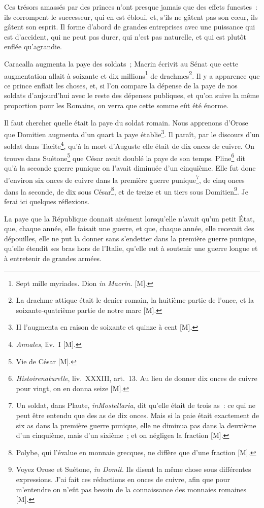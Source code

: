 \documentclass[french,twoside]{book} %
\begin{document}
Ces trésors amassés par des princes n’ont presque jamais que des effets funestes : ils corrompent le successeur, qui en est ébloui, et, s’ils ne gâtent pas son cœur, ils gâtent son esprit. Il forme d’abord de grandes entreprises avec une puissance qui est d’accident, qui ne peut pas durer, qui n’est pas naturelle, et qui est plutôt enflée qu’agrandie.\par
Caracalla augmenta la paye des soldats ; Macrin écrivit au Sénat que cette augmentation allait à soixante et dix millions\footnote{Sept mille myriades. Dion {\itshape in Macrin.} [M].} de drachmes\footnote{La drachme attique était le denier romain, la huitième partie de l’once, et la soixante-quatrième partie de notre marc [M].}. Il y a apparence que ce prince enflait les choses, et, si l’on compare la dépense de la paye de nos soldats d’aujourd’hui avec le reste des dépenses publiques, et qu’on suive la même proportion pour les Romains, on verra que cette somme eût été énorme.\par
Il faut chercher quelle était la paye du soldat romain. Nous apprenons d’Orose que Domitien augmenta d’un quart la paye établie\footnote{II l’augmenta en raison de soixante et quinze à cent [M].}. Il paraît, par le discours d’un soldat dans Tacite\footnote{{\itshape Annales}, liv. I [M].}, qu’à la mort d’Auguste elle était de dix onces de cuivre. On trouve dans Suétone\footnote{Vie de César [M].} que César avait doublé la paye de son temps. Pline\footnote{{\itshape Histoirenaturelle}, liv. XXXIII, art. 13. Au lieu de donner dix onces de cuivre pour vingt, on en donna seize [M].} dit qu’à la seconde guerre punique on l’avait diminuée d’un cinquième. Elle fut donc d’environ six onces de cuivre dans la première guerre punique\footnote{Un soldat, dans Plaute, {\itshape inMostellaria}, dit qu’elle était de trois as : ce qui ne peut être entendu que des as de dix onces. Mais si la paie était exactement de six as dans la première guerre punique, elle ne diminua pas dans la deuxième d’un cinquième, mais d’un sixième ; et on négligea la fraction [M].}, de cinq onces dans la seconde, de dix sous César\footnote{Polybe, qui l’évalue en monnaie grecques, ne diffère que d’une fraction [M].}, et de treize et un tiers sous Domitien\footnote{Voyez Orose et Suétone, {\itshape in Domit}. Ils disent la même chose sous différentes expressions. J’ai fait ces réductions en onces de cuivre, afin que pour m’entendre on n’eût pas besoin de la connaissance des monnaies romaines [M].}. Je ferai ici quelques réflexions.\par
La paye que la République donnait aisément lorsqu’elle n’avait qu’un petit État, que, chaque année, elle faisait une guerre, et que, chaque année, elle recevait des dépouilles, elle ne put la donner sans s’endetter dans la première guerre punique, qu’elle étendit ses bras hors de l’Italie, qu’elle eut à soutenir une guerre longue et à entretenir de grandes armées.\par
\end{document}
